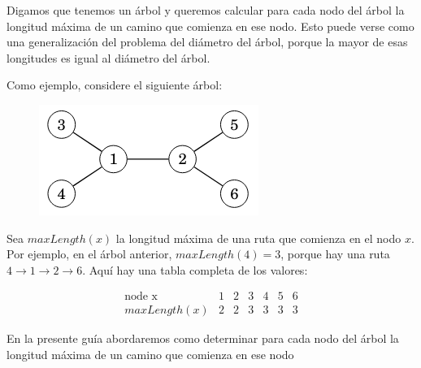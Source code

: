 Digamos que tenemos un árbol y queremos calcular para cada nodo del árbol la longitud máxima de un camino que comienza en ese nodo. Esto puede verse como una generalización del problema del diámetro del árbol, porque la mayor de esas longitudes es igual al diámetro del árbol. 

Como ejemplo, considere el siguiente árbol:

\begin{figure}[h!]
	\centering
	\includegraphics[width=0.4\linewidth]{img/all_longest_paths_1}

	\label{fig:alllongestpaths1}
\end{figure}

Sea $maxLength(x)$ la longitud máxima de una ruta que comienza en el nodo $x$. Por ejemplo, en el árbol anterior, $maxLength(4) = 3$, porque hay una ruta $4 \rightarrow 1 \rightarrow 2 \rightarrow 6$. Aquí hay una tabla completa de los valores:

$$
\begin{array}{r|cccccc}
\text{node x} 	& 1 & 2 & 3 & 4 & 5 & 6 \\
maxLength(x) 	& 2 & 2 & 3 & 3 & 3 & 3
\end{array}
$$

En la presente guía abordaremos como determinar para cada nodo del árbol la longitud máxima de un camino que comienza en ese nodo